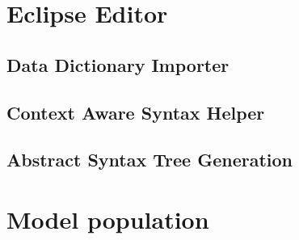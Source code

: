 \section{Eclipse Editor}

\subsection{Data Dictionary Importer}
\label{sec:datadictimp}

\subsection{Context Aware Syntax Helper}
\label{sec:ctxhelp}
\subsection{Abstract Syntax Tree Generation}

\section{Model population}